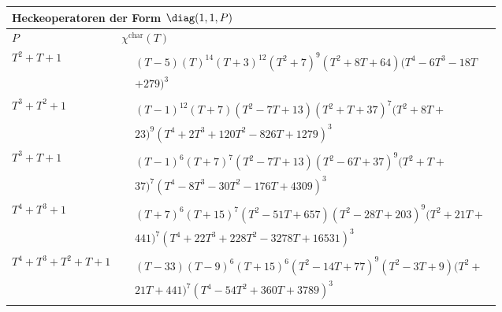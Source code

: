\begin{tabular}{| l | l |}
\multicolumn{2}{l}{\bf Heckeoperatoren der Form $\diag(1,1,P)$} \\
\hline
$P$ & $\chi^\text{char}(T)$ \\
\hline
$T^2 + T + 1$ &
$\!\begin{aligned}
	&(T - 5)(T)^{14}(T + 3)^{12}(T^{2} + 7)^{9}(T^{2} + 8T + 64)(T^{4} - 6T^{3} - 18T\\&
+ 279)^{3}\end{aligned}$ \\
\hline
$T^3 + T^2 + 1$ &
$\!\begin{aligned}
	&(T - 1)^{12}(T + 7)(T^{2} - 7T + 13)(T^{2} + T + 37)^{7}(T^{2} + 8T + \\&
23)^{9}(T^{4} + 2T^{3} + 120T^{2} - 826T + 1279)^{3}\end{aligned}$ \\
\hline
$T^3 + T + 1$ &
$\!\begin{aligned}
	&(T - 1)^{6}(T + 7)^{7}(T^{2} - 7T + 13)(T^{2} - 6T + 37)^{9}(T^{2} + T + \\&
37)^{7}(T^{4} - 8T^{3} - 30T^{2} - 176T + 4309)^{3}\end{aligned}$ \\
\hline
$T^4 + T^3 + 1$ &
$\!\begin{aligned}
	&(T + 7)^{6}(T + 15)^{7}(T^{2} - 51T + 657)(T^{2} - 28T + 203)^{9}(T^{2} + 21T + \\&
441)^{7}(T^{4} + 22T^{3} + 228T^{2} - 3278T + 16531)^{3}\end{aligned}$ \\
\hline
$T^4 + T^3 + T^2 + T + 1$ &
$\!\begin{aligned}
	&(T - 33)(T - 9)^{6}(T + 15)^{6}(T^{2} - 14T + 77)^{9}(T^{2} - 3T + 9)(T^{2} + \\&
21T + 441)^{7}(T^{4} - 54T^{2} + 360T + 3789)^{3}\end{aligned}$ \\
\hline
\end{tabular}


